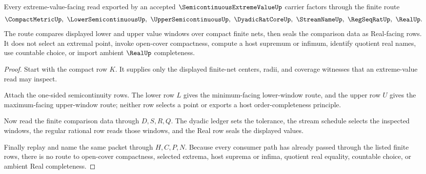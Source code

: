 \begin{theorem}
\label{thm:semicontinuous-extreme-value-finite-net-route}
Every extreme-value-facing read exported by an accepted $\SemicontinuousExtremeValueUp$ carrier factors through the finite route
$$
\CompactMetricUp,\ \LowerSemicontinuousUp,\ \UpperSemicontinuousUp,\ \DyadicRatCoreUp,\ \StreamNameUp,\ \RegSeqRatUp,\ \RealUp .
$$
The route compares displayed lower and upper value windows over compact finite nets, then seals the comparison data as Real-facing rows. It does not select an extremal point, invoke open-cover compactness, compute a host supremum or infimum, identify quotient real names, use countable choice, or import ambient $\RealUp$ completeness.
\end{theorem}
\begin{proof}
Start with the compact row $K$. It supplies only the displayed finite-net centers, radii, and coverage witnesses that an extreme-value read may inspect.

Attach the one-sided semicontinuity rows. The lower row $L$ gives the minimum-facing lower-window route, and the upper row $U$ gives the maximum-facing upper-window route; neither row selects a point or exports a host order-completeness principle.

Now read the finite comparison data through $D,S,R,Q$. The dyadic ledger sets the tolerance, the stream schedule selects the inspected windows, the regular rational row reads those windows, and the Real row seals the displayed values.

Finally replay and name the same packet through $H,C,P,N$. Because every consumer path has already passed through the listed finite rows, there is no route to open-cover compactness, selected extrema, host suprema or infima, quotient real equality, countable choice, or ambient Real completeness.
\end{proof}



